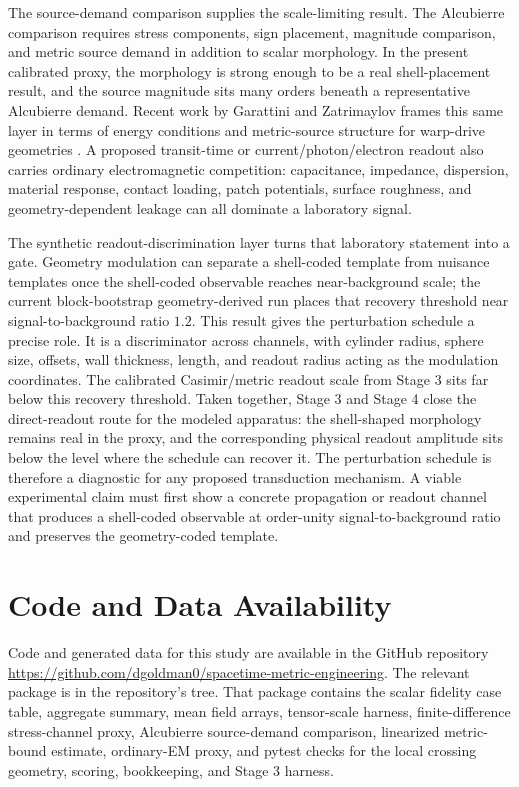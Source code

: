 \documentclass[11pt]{article}
\begin{document}
The source-demand comparison supplies the scale-limiting result. The
Alcubierre comparison requires stress components, sign placement, magnitude
comparison, and metric source demand in addition to scalar morphology. In the
present calibrated proxy, the morphology is strong enough to be a real
shell-placement result, and the source magnitude sits many orders beneath a
representative Alcubierre demand. Recent work by Garattini and Zatrimaylov
frames this same layer in terms of energy conditions and metric-source
structure for warp-drive geometries \cite{GarattiniZatrimaylov2024}. A
proposed transit-time or current/photon/electron readout also carries ordinary
electromagnetic competition: capacitance, impedance, dispersion, material
response, contact loading, patch potentials, surface roughness, and
geometry-dependent leakage can all dominate a laboratory signal.

The synthetic readout-discrimination layer turns that laboratory statement into
a gate. Geometry modulation can separate a shell-coded template from nuisance
templates once the shell-coded observable reaches near-background scale; the
current block-bootstrap geometry-derived run places that recovery threshold
near signal-to-background ratio $1.2$. This result gives the perturbation
schedule a precise role. It is a discriminator across channels, with cylinder
radius, sphere size, offsets, wall thickness, length, and readout radius acting
as the modulation coordinates. The calibrated Casimir/metric readout scale from
Stage 3 sits far below this recovery threshold. Taken together, Stage 3 and
Stage 4 close the direct-readout route for the modeled apparatus: the
shell-shaped morphology remains real in the proxy, and the corresponding
physical readout amplitude sits below the level where the schedule can recover
it. The perturbation schedule is therefore a diagnostic for any proposed
transduction mechanism. A viable experimental claim must first show a concrete
propagation or readout channel that produces a shell-coded observable at
order-unity signal-to-background ratio and preserves the geometry-coded
template.

\section{Code and Data Availability}

Code and generated data for this study are available in the GitHub repository
\url{https://github.com/dgoldman0/spacetime-metric-engineering}. The relevant
package is  in the repository's
 tree. That package contains the
scalar fidelity case table, aggregate summary, mean field arrays, tensor-scale
harness, finite-difference stress-channel proxy, Alcubierre source-demand
comparison, linearized metric-bound estimate, ordinary-EM proxy, and pytest
checks for the local crossing geometry, scoring, bookkeeping, and Stage 3
harness.
\end{document}
